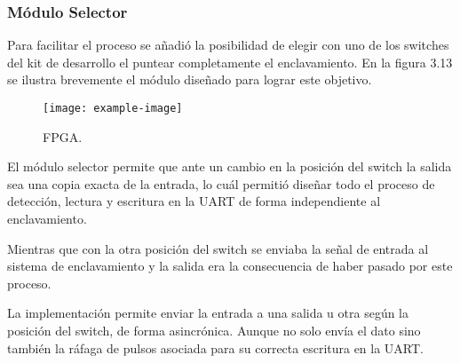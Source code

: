 \subsubsection{Módulo Selector}

\lipsum[1]

Para facilitar el proceso se añadió la posibilidad de elegir con uno de los switches del kit de desarrollo el puntear completamente el enclavamiento. En la figura 3.13 se ilustra brevemente el módulo diseñado para lograr este objetivo.

\begin{figure}[H]
	\centering
	\texttt{[image: example-image]}
	\centering\caption{FPGA.}
	\label{fig:XXX}
\end{figure}

El módulo selector permite que ante un cambio en la posición del switch la salida sea una copia exacta de la entrada, lo cuál permitió diseñar todo el proceso de detección, lectura y escritura en la UART de forma independiente al enclavamiento.

Mientras que con la otra posición del switch se enviaba la señal de entrada al sistema de enclavamiento y la salida era la consecuencia de haber pasado por este proceso.

La implementación permite enviar la entrada a una salida u otra según la posición del switch, de forma asincrónica. Aunque no solo envía el dato sino también la ráfaga de pulsos asociada para su correcta escritura en la UART.